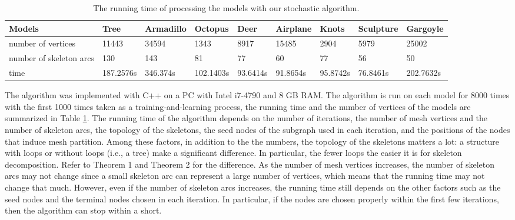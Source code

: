 \begin{table}[htb]

\begin{footnotesize}

\begin{center}

    \begin{tabular}{p{3.0cm} p{1.45cm} p{1.3cm} p{1.3cm} p{1.3cm} p{1.35cm} p{1.5cm} p{1.5cm}p{1.5cm}}

    \hline

     Models& Tree& Armadillo& Octopus& Deer& Airplane& Knots &Sculpture & Gargoyle\\ \hline
     number of vertices & 11443   & 34594   & 1343    & 8917  & 15485 & 2904    & 5979    &25002 \\ \hline
     number of skeleton arcs    &130 & 143 & 81 &77 &60 & 77 &56  &50 \\ \hline
     time    &187.2576s & 346.374s & 102.1403s &93.6414s &91.8654s & 95.8742s &76.8461s  &202.7632s \\
  \hline

    \end{tabular}

\end{center}

\end{footnotesize}

\caption{The running time of processing the models with our stochastic algorithm.}\label{tab:ertms:time}

\end{table}






The algorithm was implemented with C++ on a PC with Intel i7-4790 and 8 GB RAM. The algorithm is run on each model for 8000 times with the first 1000 times taken as a training-and-learning process, the running time and the number of vertices of the models are summarized in Table \ref{tab:ertms:time}. {\color{red} The running time of the algorithm depends on the number of iterations, the number of mesh vertices and the number of skeleton arcs, the topology of the skeletons, the seed nodes of the subgraph used in each iteration, and the positions of the nodes that induce mesh partition. Among these factors, in addition to the the numbers, the topology of the skeletons matters a lot: a structure with loops or without loops (i.e., a tree) make a significant difference. In particular, the fewer loops the easier it is for skeleton decomposition. Refer to Theorem 1 and Theorem 2 for the difference. As the number of mesh vertices increases, the number of skeleton arcs may not change since a small skeleton arc can represent a large number of vertices, which means that the running time may not change that much. However, even if the number of skeleton arcs increases, the running time still depends on the other factors such as the seed nodes and the terminal nodes chosen in each iteration. In particular, if the nodes are chosen properly within the first few iterations, then the algorithm can stop within a short.}

